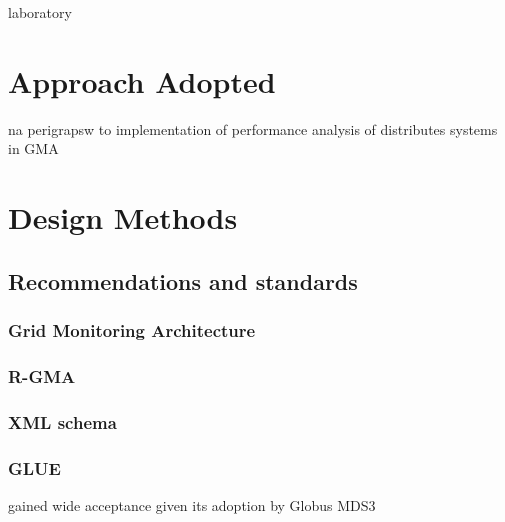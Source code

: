 laboratory

\section{Approach Adopted}

na perigrapsw to implementation of performance analysis of distributes systems
in GMA \cite{balatonuse}


\section{Design Methods}
\subsection{Recommendations and standards}
\subsubsection{Grid Monitoring Architecture}
\subsubsection{R-GMA}
\subsubsection{XML schema}
\subsubsection{GLUE}
gained wide acceptance given its adoption by Globus MDS3


